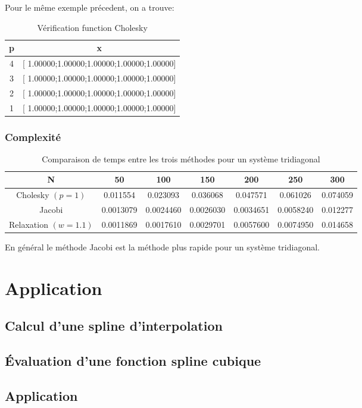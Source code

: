 \documentclass[a4paper,11pt]{article}
\begin{document}
Pour le même exemple précedent, on a trouve:

\begin{table}[h!]
  \begin{center}
    \begin{tabular}{|c|c|}
      \hline 
      p & x \\
      \hline 
      \hline 
      4 & [ 1.00000;1.00000;1.00000;1.00000;1.00000]\\
      3 & [ 1.00000;1.00000;1.00000;1.00000;1.00000]\\
      2 & [ 1.00000;1.00000;1.00000;1.00000;1.00000]\\
      1 & [ 1.00000;1.00000;1.00000;1.00000;1.00000]\\
      \hline 
    \end{tabular}
  \end{center}
  \caption{Vérification function Cholesky}
\end{table}

\subsubsection{Complexité}

\begin{table}[h!]
  \begin{center}
    \begin{tabular}{|c|c|c|c|c|c|c|}
      \hline 
      N & 50 & 100 & 150 & 200 & 250 & 300 \\
      \hline 
      \hline 
      Cholesky $(p=1)$ & 0.011554       &  0.023093 & 0.036068
      & 0.047571 & 0.061026 & 0.074059 \\
      Jacobi &  0.0013079
      &   0.0024460
      &  0.0026030
      &  0.0034651
      &  0.0058240
      & 0.012277\\
      Relaxation $(w = 1.1)$
      & 0.0011869 & 0.0017610
      &0.0029701 & 0.0057600
      & 0.0074950 & 0.014658\\
      \hline 
    \end{tabular}
  \end{center}
  \caption{Comparaison de temps entre les trois méthodes pour un système tridiagonal}
\end{table}

En  général le  méthode Jacobi est la  méthode plus  rapide pour  un
système tridiagonal.

\section{Application}
\subsection{Calcul d'une spline d'interpolation}
\subsection{Évaluation d'une fonction spline cubique}
\subsection{Application}
\end{document}
